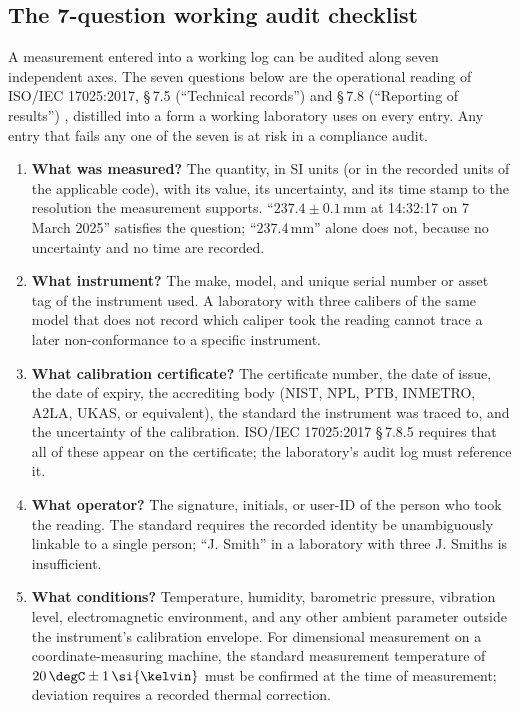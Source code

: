 \subsection{The 7-question working audit checklist}

A measurement entered into a working log can be audited along
seven independent axes. The seven questions below are the
operational reading of ISO/IEC 17025:2017, \S\,7.5 (``Technical
records'') and \S\,7.8 (``Reporting of results'')
\cite{std:ch01t3b-iso17025-2017}, distilled into a form a working
laboratory uses on every entry. Any entry that fails any one of the
seven is at risk in a compliance audit.

\begin{enumerate}[leftmargin=*]
  \item \textbf{What was measured?} The quantity, in SI units (or
    in the recorded units of the applicable code), with its
    value, its uncertainty, and its time stamp to the resolution
    the measurement supports. ``$237.4 \pm 0.1 \,\si{\milli\meter}$
    at 14:32:17 on 7 March 2025'' satisfies the question;
    ``$237.4 \,\si{\milli\meter}$'' alone does not, because no
    uncertainty and no time are recorded.

  \item \textbf{What instrument?} The make, model, and unique
    serial number or asset tag of the instrument used. A
    laboratory with three calibers of the same model that does
    not record which caliper took the reading cannot trace a
    later non-conformance to a specific instrument.

  \item \textbf{What calibration certificate?} The certificate
    number, the date of issue, the date of expiry, the
    accrediting body (NIST, NPL, PTB, INMETRO, A2LA, UKAS, or
    equivalent), the standard the instrument was traced to, and
    the uncertainty of the calibration. ISO/IEC 17025:2017
    \S\,7.8.5 requires that all of these appear on the
    certificate; the laboratory's audit log must reference it.

  \item \textbf{What operator?} The signature, initials, or
    user-ID of the person who took the reading. The standard
    requires the recorded identity be unambiguously linkable to a
    single person; ``J. Smith'' in a laboratory with three
    J. Smiths is insufficient.

  \item \textbf{What conditions?} Temperature, humidity,
    barometric pressure, vibration level, electromagnetic
    environment, and any other ambient parameter outside the
    instrument's calibration envelope. For dimensional
    measurement on a coordinate-measuring machine, the standard
    measurement temperature of $20 \,\degC \pm 1 \,\si{\kelvin}$
    must be confirmed at the time of measurement; deviation
    requires a recorded thermal correction.


\end{enumerate}

